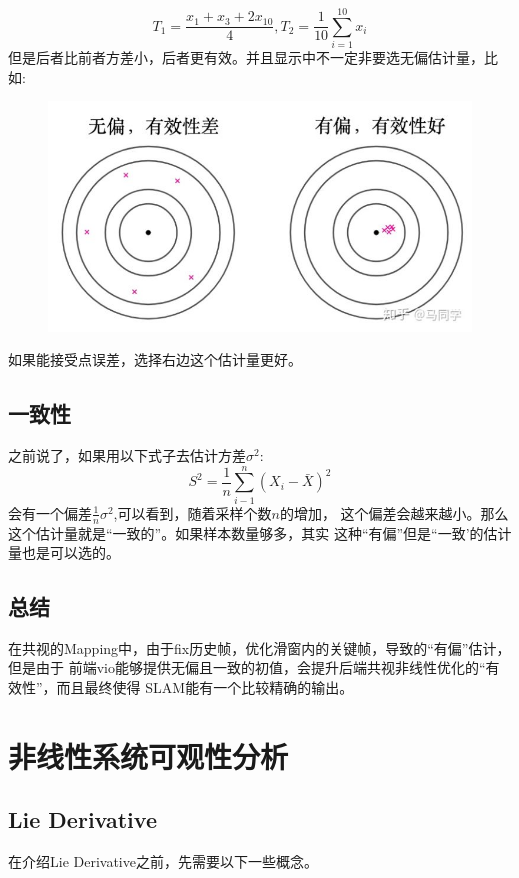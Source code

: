 \documentclass{article}
\begin{document}
\begin{equation}
    T_1=\frac{x_1+x_3+2x_{10}}{4}, T_2=\frac{1}{10}\sum\limits_{i=1}^{10}{x_i}
\end{equation}
但是后者比前者方差小，后者更有效。并且显示中不一定非要选无偏估计量，比如:
\begin{figure}[!tbp]
    \centering
    \includegraphics[width=15cm]{figure8.jpg}
\end{figure}
如果能接受点误差，选择右边这个估计量更好。

\subsection{一致性}
之前说了，如果用以下式子去估计方差$\sigma^2$:
\begin{equation}
    S^2=\frac{1}{n}\sum\limits_{i-1}^n{(X_i-\bar{X})^2}
\end{equation}
会有一个偏差$\frac{1}{n}\sigma^2$,可以看到，随着采样个数$n$的增加，
这个偏差会越来越小。那么这个估计量就是“一致的”。如果样本数量够多，其实
这种“有偏”但是“一致'的估计量也是可以选的。
\subsection{总结}
在共视的Mapping中，由于fix历史帧，优化滑窗内的关键帧，导致的“有偏”估计，但是由于
前端vio能够提供无偏且一致的初值，会提升后端共视非线性优化的“有效性”，而且最终使得
SLAM能有一个比较精确的输出。

\section{非线性系统可观性分析}
\subsection{Lie Derivative}
在介绍Lie Derivative之前，先需要以下一些概念。\par
\end{document}
